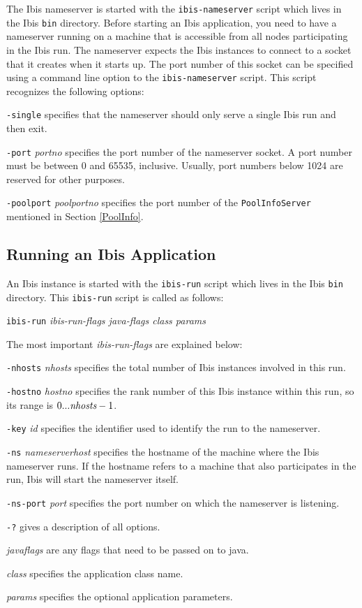 \documentclass[10pt]{article}
\newcommand{\mysubsection}[1]{\subsection{#1}\label{#1}}
\begin{document}
The Ibis nameserver is started with the \texttt{ibis-nameserver} script which
lives in the Ibis \texttt{bin} directory. Before starting an Ibis application,
you need to have a nameserver running on a machine that is accessible
from all nodes participating in the Ibis run.
The nameserver expects the Ibis instances to connect to a
socket that it creates when it starts up.
The port number of this socket can be specified using a command line
option to the \texttt{ibis-nameserver} script. This script recognizes
the following options:
\begin{description}
\item{\texttt{-single}}
specifies that the nameserver should only serve a single Ibis run
and then exit.
\item{\texttt{-port} \emph{portno}}
specifies the port number of the nameserver socket.
A port number must be between 0 and 65535, inclusive. Usually,
port numbers below 1024 are reserved for other purposes.
\item{\texttt{-poolport} \emph{poolportno}}
specifies the port number of the \texttt{PoolInfoServer} mentioned
in Section \ref{PoolInfo}.
\end{description}

\mysubsection{Running an Ibis Application}

An Ibis instance is started with the \texttt{ibis-run} script which
lives in the Ibis \texttt{bin} directory.  This \texttt{ibis-run}
script is called as follows:
\begin{center}
\texttt{ibis-run} \emph{ibis-run-flags java-flags class params}
\end{center}
The most important \emph{ibis-run-flags} are explained below:
\begin{description}
\item{\texttt{-nhosts} \emph{nhosts}}
specifies the total number of Ibis instances involved in this run.
\item{\texttt{-hostno} \emph{hostno}}
specifies the rank number of this Ibis instance within this run,
so its range is $0 ... \emph{nhosts}-1$.
\item{\texttt{-key} \emph{id}}
specifies the identifier used to identify the run to the nameserver.
\item{\texttt{-ns} \emph{nameserverhost}}
specifies the hostname of the machine where the Ibis nameserver runs.
If the hostname refers to a machine that also participates in the run,
Ibis will start the nameserver itself.
\item{\texttt{-ns-port} \emph{port}}
specifies the port number on which the nameserver is listening.
\item{\texttt{-?}}
gives a description of all options.
\item{\emph{javaflags}}
are any flags that need to be passed on to java.
\item{\emph{class}}
specifies the application class name.
\item{\emph{params}}
specifies the optional application parameters.
\end{description}
\end{document}
